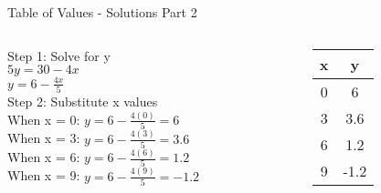 \documentclass[aspectratio=169]{beamer}
\begin{document}
\begin{frame}{Table of Values - Solutions Part 2}
    \begin{tcolorbox}[colback=lightgray,colframe=accent,title=Solution for $4x + 5y = 30$]
        \footnotesize
        \begin{columns}
            \begin{column}{0.6\textwidth}
                Step 1: Solve for y \\
                $5y = 30 - 4x$ \\[2em]
                $y = 6 - \frac{4x}{5}$ \\[2.5em]
                
                Step 2: Substitute x values \\
                When x = 0: $y = 6 - \frac{4(0)}{5} = 6$ \\[1.5em]
                When x = 3: $y = 6 - \frac{4(3)}{5} = 3.6$ \\[1.5em]
                When x = 6: $y = 6 - \frac{4(6)}{5} = 1.2$ \\[1.5em]
                When x = 9: $y = 6 - \frac{4(9)}{5} = -1.2$
            \end{column}
            \begin{column}{0.4\textwidth}
                \vspace*{-1.5em} %
                \begin{center}
                \begin{tabular}{|c|c|}
                    \hline
                    \rowcolor{primary!20} x & y \\
                    \hline
                    0 & 6 \\
                    3 & 3.6 \\
                    6 & 1.2 \\
                    9 & -1.2 \\
                    \hline
                \end{tabular}
                \end{center}
            \end{column}
        \end{columns}
    \end{tcolorbox}
    \vfill
\end{frame}
\end{document}
